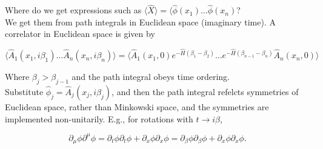 \noindent Where do we get expressions such as $\langle \hat{X} \rangle = \langle \hat{\phi} (x_1) \dots \hat{\phi} (x_n)$? \\

\noindent We get them from path integrals in Euclidean space (imaginary time). A correlator in Euclidean space is given by 

\begin{equation}
\langle \hat{A}_1 (x_1, i\beta_1) \dots \hat{A}_n (x_n, i\beta_n) \rangle = \langle \hat{A}_1 (x_1, 0) e^{-\hat{H}(\beta_1 - \beta_2)} \dots e^{-\hat{H}(\beta_{n-1} - \beta_n)} \hat{A}_n(x_n, 0) \rangle
\end{equation}

\noindent Where $\beta_j > \beta_{j-1}$ and the path integral obeys time ordering. \\

\noindent Substitute $\hat{\phi}_j = \hat{A}_j (x_j, i\beta_j)$, and then the path integral refelcts symmetries of Euclidean space, rather than Minkowski space, and the symmetries are implemented non-unitarily. E.g., for rotations with $t \rightarrow i\beta$,

\begin{equation}
\partial_\mu \phi \partial^\mu \phi = \partial_t \phi \partial_t \phi + \partial_x \phi \partial_x \phi = \partial_\beta \phi \partial_\beta \phi + \partial_x \phi \partial_x \phi.
\end{equation}